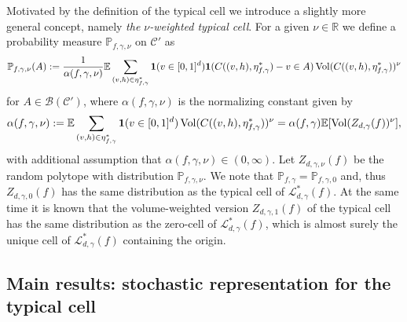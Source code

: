 \documentclass[11pt,a4paper]{article}
\theoremstyle{plain}
\theoremstyle{definition}
\theoremstyle{remark}
\def\EE{\mathbb{E}}
\def\PP{\mathbb{P}}
\def\RR{\mathbb{R}}
\def\cB{\mathcal{B}}
\def\cC{\mathcal{C}}
\def\cL{\mathcal{L}}
\newcommand{\Vol}{\operatorname{Vol}}
\begin{document}
Motivated by the definition of the typical cell we introduce a slightly more general concept, namely \textit{the $\nu$-weighted typical cell}. For a given $\nu\in\RR$ we define a probability measure $\PP_{f,\gamma,\nu}$ on $\cC'$ as 
\begin{equation*}
    \PP_{f,\gamma,\nu}(A) := {1\over \alpha(f,\gamma,\nu)}\EE\sum_{(v,h)\in \eta^*_{f,\gamma}}{\bf 1}(v\in[0,1]^d){\bf 1}(C((v,h),\eta^*_{f,\gamma})-v\in A)\Vol(C((v,h),\eta^*_{f,\gamma}))^\nu
\end{equation*}
for $A\in  \cB(\cC')$, where  $\alpha(f,\gamma,\nu)$ is the normalizing constant given by
\begin{equation*}
    \alpha(f,\gamma,\nu):= \EE \sum_{(v,h)\in \eta^*_{f,\gamma}}{{\bf 1}}(v\in[0,1]^d)\Vol(C((v,h),\eta^*_{f,\gamma}))^\nu=\alpha(f,\gamma)\EE[\Vol(Z_{d,\gamma}(f))^\nu],
\end{equation*}
with additional assumption that $\alpha(f,\gamma,\nu)\in (0,\infty)$. Let $Z_{d,\gamma,\nu}(f)$ be the random polytope with distribution $\PP_{f,\gamma,\nu}$. We note that $\PP_{f,\gamma}=\PP_{f,\gamma,0}$ and, thus $Z_{d,\gamma,0}(f)$ has the same distribution as the typical cell of $\cL^*_{d,\gamma}(f)$. At the same time it is known \cite[Theorem 10.4.1 and Equation (10.4)]{SW} that the volume-weighted version $Z_{d,\gamma,1}(f)$ of the typical cell has the same distribution as the zero-cell of $\cL^*_{d,\gamma}(f)$, which is almost surely the unique cell of $\cL^*_{d,\gamma}(f)$ containing the origin. 

\subsection{Main results: stochastic representation for the typical cell}
\end{document}
